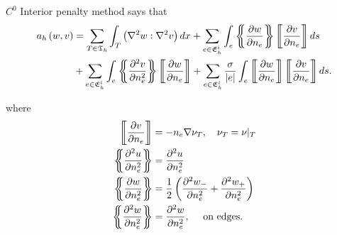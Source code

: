 $C^{0}$ Interior penalty method says that
\begin{align*}
    a_{h} \left( w,v \right) &= \sum_{T \in \mathfrak{T} _{h}}^{} \int_{T}^{} \left( \nabla ^2 w : \nabla ^2 v \right)
    dx  + \sum_{e \in \mathfrak{E} _{h}^{i}}^{} \int_{e}^{} \mean{ \frac{\partial w}{\partial n_{e}} } \jump{
    \frac{\partial v}{\partial n_{e}} } ds        \\
    & + \sum_{e \in \mathfrak{E} _{h}^{i}}^{}  \int_{e}^{}  \mean{ \frac{\partial ^2 v}{\partial n_{e}^2 } } \jump{
    \frac{\partial w}{\partial n_{e}} }     + \sum_{e \in \mathfrak{E} _{h}^{i}}^{}  \frac{\sigma }{\left\lvert e
\right\rvert } \int_{e}^{} \jump{ \frac{\partial w}{\partial n_{e}} } \jump{ \frac{\partial v}{\partial n_{e}} } ds
.\end{align*}

where
\begin{align*}
    \jump{ \frac{\partial v}{\partial n_{e}} } &= - n_{e} \nabla \nu_{T} , \quad \nu _{T} = \nu |_{T}   \\
    \mean{ \frac{\partial ^2 u}{\partial n_{e}^2  } }  & = \frac{\partial ^2 u }{\partial n_{e} ^2 }  \\
    \mean{ \frac{\partial w}{\partial n^2_{e}} }  &=  \frac{1}{2} \left( \frac{\partial^2 w_{-} }{\partial n^2_{e} } +
    \frac{\partial ^2 w_{+}}{\partial n^2_{e} }   \right) \\
    \mean{ \frac{\partial ^2 w}{\partial n^2_{e} } } & = \frac{\partial ^2 w}{\partial n^2_{e}}, \quad \text{ on edges}
.\end{align*}





